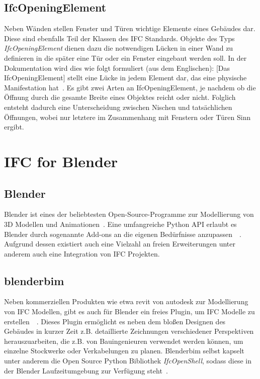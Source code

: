 \subsection{IfcOpeningElement}\label{basics:IfcOpeningElement}
Neben Wänden stellen Fenster und Türen wichtige Elemente eines Gebäudes dar.
Diese sind ebenfalls Teil der Klassen des IFC Standards.
Objekte des Typs \textit{IfcOpeningElement} dienen dazu die notwendigen Lücken in einer Wand zu definieren in die später eine Tür oder ein Fenster eingebaut werden soll.
In der Dokumentation wird dies wie folgt formuliert (aus dem Englischen): \glqq{}[Das IfcOpeningElement] stellt eine Lücke in jedem Element dar, das eine physische Manifestation hat\grqq{}~\cite{IFC4310OpeningElement:online}.
Es gibt zwei Arten an IfcOpeningElement, je nachdem ob die Öffnung durch die gesamte Breite eines Objektes reicht oder nicht. 
Folglich entsteht dadurch eine Unterscheidung zwischen Nischen und tatsächlichen Öffnungen, wobei nur letztere im Zusammenhang mit Fenstern oder Türen Sinn ergibt.

\section{IFC for Blender}\label{basics:blender}
\subsection{Blender}
Blender ist eines der beliebtesten Open-Source-Programme zur Modellierung von 3D Modellen und Animationen~\cite{blendero56:online}.
Eine umfangreiche Python API erlaubt es Blender durch sogenannte Add-ons an die eigenen Bedürfnisse anzupassen~\cite{PythonWebsite:online}~\cite{BlenderPythonAPI:online}.
Aufgrund dessen existiert auch eine Vielzahl an freien Erweiterungen \textendash{} unter anderem auch eine Integration von IFC Projekten.

\subsection{blenderbim}\label{basics:blenderbim}
Neben kommerziellen Produkten wie etwa revit von autodesk zur Modellierung von IFC Modellen, gibt es auch für Blender ein freies Plugin, um IFC Modelle zu erstellen~\cite{RevitSof26:online}~\cite{BlenderB43:online}.
Dieses Plugin ermöglicht es neben dem bloßen Designen des Gebäudes in kurzer Zeit z.B. detaillierte Zeichnungen verschiedener Perspektiven herauszuarbeiten, die z.B. von Bauingenieuren verwendet werden können, um einzelne Stockwerke oder Verkabelungen zu planen.
Blenderbim selbst kapselt unter anderem die Open Source Python Bibliothek \textit{IfcOpenShell}, sodass diese in der Blender Laufzeitumgebung zur Verfügung steht~\cite{IFCOpenShell:online}.

